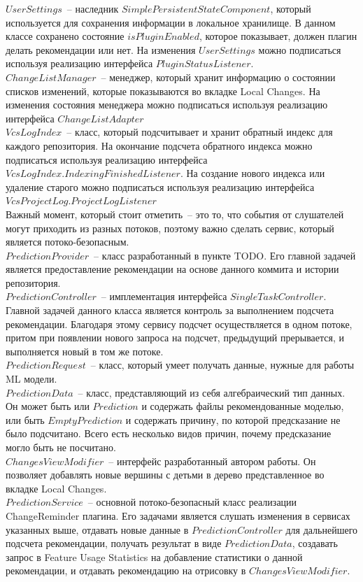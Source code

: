\documentclass[times]{itmo-student-thesis}
\begin{document}
$UserSettings$~-- наследник $SimplePersistentStateComponent$, который используется для сохранения информации в локальное хранилище. В данном классе сохранено состояние $isPluginEnabled$, которое показывает, должен плагин делать рекомендации или нет. На изменения $UserSettings$ можно подписаться используя реализацию интерфейса $PluginStatusListener$.\\
$ChangeListManager$~-- менеджер, который хранит информацию о состоянии списков изменений, которые показываются во вкладке Local Changes. На изменения состояния менеджера можно подписаться используя реализацию интерфейса $ChangeListAdapter$\\
$VcsLogIndex$~-- класс, который подсчитывает и хранит обратный индекс для каждого репозитория. На окончание подсчета обратного индекса можно подписаться используя реализацию интерфейса $VcsLogIndex.IndexingFinishedListener$. На создание нового индекса или удаление старого можно подписаться используя реализацию интерфейса $VcsProjectLog.ProjectLogListener$\\
Важный момент, который стоит отметить~-- это то, что события от слушателей могут приходить из разных потоков, поэтому важно сделать сервис, который является потоко-безопасным.\\
$PredictionProvider$~-- класс разработанный в пункте TODO. Его главной задачей является предоставление рекомендации на основе данного коммита и истории репозитория.\\
$PredictionController$~-- имплементация интерфейса $SingleTaskController$. Главной задачей данного класса является контроль за выполнением подсчета рекомендации. Благодаря этому сервису подсчет осуществляется в одном потоке, притом при появлении нового запроса на подсчет, предыдущий прерывается, и выполняется новый в том же потоке.\\
$PredictionRequest$~-- класс, который умеет получать данные, нужные для работы ML модели. \\
$PredictionData$~-- класс, представляющий из себя алгебраический тип данных. Он может быть или $Prediction$ и содержать файлы рекомендованные моделью, или быть $EmptyPrediction$ и содержать причину, по которой предсказание не было подсчитано.
Всего есть несколько видов причин, почему предсказание могло быть не посчитано.\\
$ChangesViewModifier$~-- интерфейс разработанный автором работы. Он позволяет добавлять новые вершины с детьми в дерево представленное во вкладке Local Changes.\\
$PredictionService$~-- основной потоко-безопасный класс реализации ChangeReminder плагина. Его задачами является слушать изменения в сервисах указанных выше, отдавать новые данные в $PredictionController$ для дальнейшего подсчета рекомендации, получать результат в виде $PredictionData$, создавать запрос в Feature Usage Statistics на добавление статистики о данной рекомендации, и отдавать рекомендацию на отрисовку в $ChangesViewModifier$.
\end{document}
